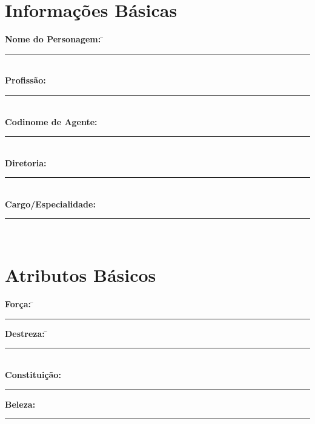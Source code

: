 \documentclass[a4paper,12pt]{article}
\begin{document}
\section*{Informações Básicas}
\begin{tabbing}
    \textbf{Nome do Personagem:} \hspace{1cm} \= \rule{10cm}{0.4pt} \\
    \textbf{Profissão:} \> \rule{10cm}{0.4pt} \\
    \textbf{Codinome de Agente:} \> \rule{10cm}{0.4pt} \\
    \textbf{Diretoria:} \> \rule{10cm}{0.4pt} \\
    \textbf{Cargo/Especialidade:} \> \rule{10cm}{0.4pt} \\
\end{tabbing}

\section*{Atributos Básicos}
\begin{tabbing}
    \textbf{Força:} \hspace{1.5cm} \= \rule{3cm}{0.4pt} \hspace{2cm} \=
    \textbf{Destreza:}  \= \rule{3cm}{0.4pt} \\
    \textbf{Constituição:}  \> \rule{3cm}{0.4pt}  \>
    \textbf{Beleza:}  \> \rule{3cm}{0.4pt} \\
\end{tabbing}
\end{document}
